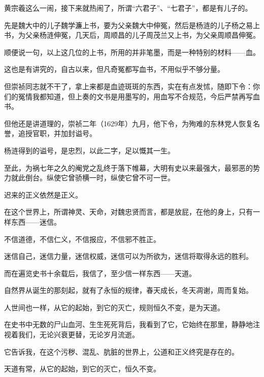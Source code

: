 \begin{multicols}{\theparacolNo}
		黄宗羲这么一闹，接下来就热闹了，所谓“六君子”、“七君子”，都是有儿子的。

		先是魏大中的儿子魏学濂上书，要为父亲魏大中伸冤，然后是杨涟的儿子杨之易上书，为父亲杨涟伸冤，几天后，周顺昌的儿子周茂兰又上书，为父亲周顺昌伸冤。

		顺便说一句，以上这几位的上书，所用的并非笔墨，而是一种特别的材料——血。

		这也是有讲究的，自古以来，但凡奇冤都写血书，不用似乎不够分量。

		但崇祯同志就不干了，拿上来都是血迹斑斑的东西，实在有点发怵，随即下令：你们的冤情我都知道，但上奏的文书是用墨写的，用血写不合规范，今后严禁再写血书。

		但他还是讲道理的，崇祯二年（1629年）九月，他下令，为殉难的东林党人恢复名誉，追授官职，并加封谥号。

		杨涟得到的谥号，是忠烈，以此二字，足以慨其一生。

		至此，为祸七年之久的阉党之乱终于落下帷幕，大明有史以来最强大，最邪恶的势力就此倒台。纵使它曾骄横一时，纵使它曾不可一世。

		迟来的正义依然是正义。

		在这个世界上，所谓神灵、天命，对魏忠贤而言，都是放屁，在他的身上，只有一样东西——迷信。

		不信道德，不信仁义，不信报应，不信邪不胜正。

		迷信自己，迷信力量，迷信权威，迷信可以为所欲为，迷信将取得永远的胜利。

		而在遍览史书十余载后，我信了，至少信一样东西——天道。

		自然界从诞生的那刻起，就有了永恒的规律，春天成长，冬天凋谢，周而复始。

		人世间也一样，从它的起始，到它的灭亡，规则恒久不变，是为天道。

		在史书中无数的尸山血河、生生死死背后，我看到了它，它始终在那里，静静地注视着我们，无论兴衰更替，无论岁月流逝。

		它告诉我，在这个污秽、混乱、肮脏的世界上，公道和正义终究是存在的。

		天道有常，从它的起始，到它的灭亡，恒久不变。
		\ifnum{}
	\end{multicols}
\fi
\newpage
